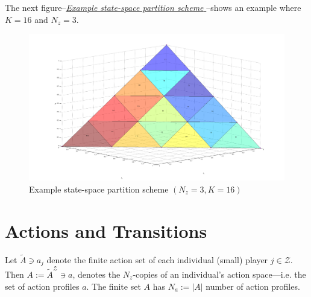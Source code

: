 \documentclass[a4paper,10pt,english]{sphinxmanual}
\begin{document}
The next figure--{\hyperref[statespace:figure-partition]{\emph{Example state-space partition scheme }}}--shows an example where \(K = 16\) and \(N_z = 3\).
\begin{figure}[htbp]
\centering
\capstart

\includegraphics[width=0.900\linewidth]{partition.png}
\caption{Example state-space partition scheme \((N_z = 3, K = 16)\)}\label{statespace:figure-partition}\end{figure}


\chapter{Actions and Transitions}
\label{actions_transitions::doc}\label{actions_transitions:actions-and-transitions}
Let \(\tilde{A} \ni a_{j}\) denote the finite action set of each individual (small)
player \(j \in \mathcal{Z}\). Then \(A := \tilde{A}^{\mathcal{Z}} \ni a\), denotes the
\(N_{z}\)-copies of an individual's action space---i.e. the set of action
profiles \(a\). The finite  set \(A\) has \(N_{a} := |A|\) number of
action profiles.
\end{document}
